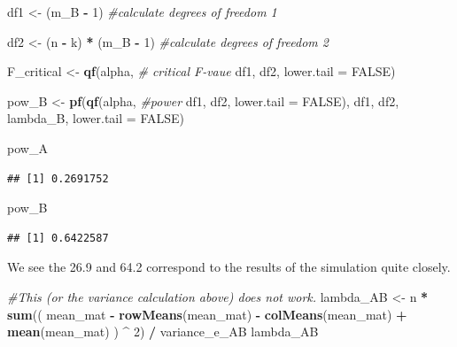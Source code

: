 \documentclass[]{book}
\newenvironment{Shaded}{\begin{snugshade}}{\end{snugshade}}
\newcommand{\CommentTok}[1]{\textcolor[rgb]{0.56,0.35,0.01}{\textit{#1}}}
\newcommand{\DataTypeTok}[1]{\textcolor[rgb]{0.13,0.29,0.53}{#1}}
\newcommand{\DecValTok}[1]{\textcolor[rgb]{0.00,0.00,0.81}{#1}}
\newcommand{\KeywordTok}[1]{\textcolor[rgb]{0.13,0.29,0.53}{\textbf{#1}}}
\newcommand{\NormalTok}[1]{#1}
\newcommand{\OperatorTok}[1]{\textcolor[rgb]{0.81,0.36,0.00}{\textbf{#1}}}
\newcommand{\OtherTok}[1]{\textcolor[rgb]{0.56,0.35,0.01}{#1}}
\newcommand{\StringTok}[1]{\textcolor[rgb]{0.31,0.60,0.02}{#1}}
\begin{document}
\begin{Shaded}
\begin{Highlighting}[]
\NormalTok{df1 <-}\StringTok{ }\NormalTok{(m_B }\OperatorTok{-}\StringTok{ }\DecValTok{1}\NormalTok{) }\CommentTok{#calculate degrees of freedom 1}

\NormalTok{df2 <-}\StringTok{ }\NormalTok{(n }\OperatorTok{-}\StringTok{ }\NormalTok{k) }\OperatorTok{*}\StringTok{ }\NormalTok{(m_B }\OperatorTok{-}\StringTok{ }\DecValTok{1}\NormalTok{) }\CommentTok{#calculate degrees of freedom 2}

\NormalTok{F_critical <-}\StringTok{ }\KeywordTok{qf}\NormalTok{(alpha, }\CommentTok{# critical F-vaue}
\NormalTok{                 df1,}
\NormalTok{                 df2,}
                 \DataTypeTok{lower.tail =} \OtherTok{FALSE}\NormalTok{) }

\NormalTok{pow_B <-}\StringTok{ }\KeywordTok{pf}\NormalTok{(}\KeywordTok{qf}\NormalTok{(alpha, }\CommentTok{#power }
\NormalTok{             df1, }
\NormalTok{             df2, }
             \DataTypeTok{lower.tail =} \OtherTok{FALSE}\NormalTok{), }
\NormalTok{          df1, }
\NormalTok{          df2, }
\NormalTok{          lambda_B, }
          \DataTypeTok{lower.tail =} \OtherTok{FALSE}\NormalTok{)}

\NormalTok{pow_A}
\end{Highlighting}
\end{Shaded}

\begin{verbatim}
## [1] 0.2691752
\end{verbatim}

\begin{Shaded}
\begin{Highlighting}[]
\NormalTok{pow_B}
\end{Highlighting}
\end{Shaded}

\begin{verbatim}
## [1] 0.6422587
\end{verbatim}

We see the 26.9 and 64.2 correspond to the results of the simulation quite closely.

\begin{Shaded}
\begin{Highlighting}[]
\CommentTok{#This (or the variance calculation above) does not work.}
\NormalTok{lambda_AB <-}\StringTok{ }\NormalTok{n }\OperatorTok{*}\StringTok{ }\KeywordTok{sum}\NormalTok{((}
\NormalTok{mean_mat }\OperatorTok{-}\StringTok{ }\KeywordTok{rowMeans}\NormalTok{(mean_mat) }\OperatorTok{-}\StringTok{ }\KeywordTok{colMeans}\NormalTok{(mean_mat) }\OperatorTok{+}\StringTok{ }\KeywordTok{mean}\NormalTok{(mean_mat)}
\NormalTok{) }\OperatorTok{^}\StringTok{ }\DecValTok{2}\NormalTok{) }\OperatorTok{/}\StringTok{ }\NormalTok{variance_e_AB}
\NormalTok{lambda_AB}
\end{Highlighting}
\end{Shaded}
\end{document}
